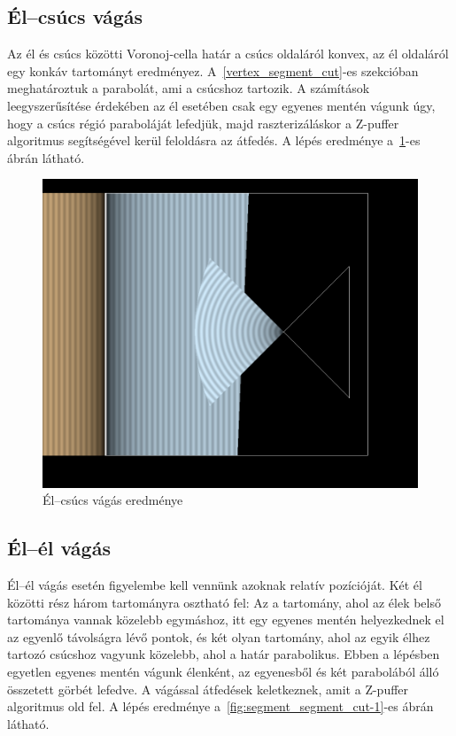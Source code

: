 \subsection{Él--csúcs vágás}
Az él és csúcs közötti Voronoj-cella határ a csúcs oldaláról konvex, az él oldaláról egy konkáv tartományt eredményez. A~\ref{vertex_segment_cut}-es szekcióban meghatároztuk a parabolát, ami a csúcshoz tartozik. A számítások leegyszerűsítése érdekében az él esetében csak egy egyenes mentén vágunk úgy, hogy a csúcs régió paraboláját lefedjük, majd raszterizáláskor a Z-puffer algoritmus segítségével kerül feloldásra az átfedés. A lépés eredménye a~\ref{fig:segment_vertex_cut-1}-es ábrán látható.

\begin{figure}[H]
	\centering
	\includegraphics[width=.55\linewidth]{images/segment_vertex_cut.png}
	\caption{Él--csúcs vágás eredménye}
	\label{fig:segment_vertex_cut-1}
\end{figure}

\subsection{Él--él vágás}
Él--él vágás esetén figyelembe kell vennünk azoknak relatív pozícióját. Két él közötti rész három tartományra osztható fel: Az a tartomány, ahol az élek belső tartománya vannak közelebb egymáshoz, itt egy egyenes mentén helyezkednek el az egyenlő távolságra lévő pontok, és két olyan tartomány, ahol az egyik élhez tartozó csúcshoz vagyunk közelebb, ahol a határ parabolikus. Ebben a lépésben egyetlen egyenes mentén vágunk élenként, az egyenesből és két parabolából álló összetett görbét lefedve. A vágással átfedések keletkeznek, amit a Z-puffer algoritmus old fel. A lépés eredménye a~\ref{fig:segment_segment_cut-1}-es ábrán látható.

